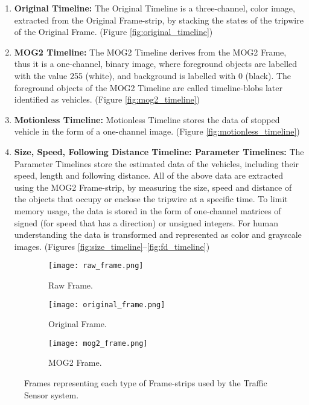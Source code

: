 \begin{enumerate}
	\item \textbf{Original Timeline:} The Original Timeline is a three-channel, color image, extracted from the Original Frame-strip, by stacking the states of the tripwire of the Original Frame. (Figure \ref{fig:original_timeline})
	
	\item \textbf{MOG2 Timeline:} The MOG2 Timeline derives from the MOG2 Frame, thus it is a one-channel, binary image, where foreground objects are labelled with the value 255 (white), and background is labelled with 0 (black). The foreground objects of the MOG2 Timeline are called timeline-blobs later identified as vehicles. (Figure \ref{fig:mog2_timeline})
	
	\item \textbf{Motionless Timeline:} Motionless Timeline stores the data of stopped vehicle in the form of a one-channel image. (Figure \ref{fig:motionless_timeline})
	
	\item \textbf{Size, Speed, Following Distance Timeline: Parameter Timelines:}
	The Parameter Timelines store the estimated data of the vehicles, including their speed, length and following distance. All of the above data are extracted using the MOG2 Frame-strip, by measuring the size, speed and distance of the objects that occupy or enclose the tripwire at a specific time.
	To limit memory usage, the data is stored in the form of one-channel matrices of signed (for speed that has a direction) or unsigned integers. For human understanding the data is transformed and represented as color and grayscale images. (Figures \ref{fig:size_timeline}--\ref{fig:fd_timeline})
\end{enumerate}

\begin{figure}[!h]
	\centering
	\begin{subfigure}[!h]{0.5\textwidth}
		\texttt{[image: raw\_frame.png]}
		\caption{Raw Frame. \label{fig:raw_frame}}
	\end{subfigure}
	\quad
	\begin{subfigure}[!h]{0.35\textwidth}
		\texttt{[image: original\_frame.png]}
		\caption{Original Frame.\label{fig:original_frame}}
	\end{subfigure}
	\hfill
	\begin{subfigure}[!h]{0.35\textwidth}
		\texttt{[image: mog2\_frame.png]}
		\caption{MOG2 Frame. \label{fig:mog2_frame}}
	\end{subfigure}
	\caption[Frame-strip types]{Frames representing each type of Frame-strips used by the Traffic Sensor system.\label{fig:frame_types}}
\end{figure}

